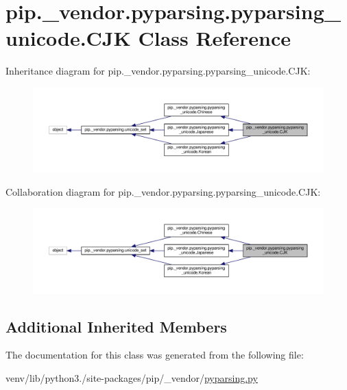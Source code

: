 \hypertarget{classpip_1_1__vendor_1_1pyparsing_1_1pyparsing__unicode_1_1CJK}{}\section{pip.\+\_\+vendor.\+pyparsing.\+pyparsing\+\_\+unicode.\+C\+JK Class Reference}
\label{classpip_1_1__vendor_1_1pyparsing_1_1pyparsing__unicode_1_1CJK}


Inheritance diagram for pip.\+\_\+vendor.\+pyparsing.\+pyparsing\+\_\+unicode.\+C\+JK\+:
\nopagebreak
\begin{figure}[H]
\begin{center}
\leavevmode
\includegraphics[width=350pt]{classpip_1_1__vendor_1_1pyparsing_1_1pyparsing__unicode_1_1CJK__inherit__graph}
\end{center}
\end{figure}


Collaboration diagram for pip.\+\_\+vendor.\+pyparsing.\+pyparsing\+\_\+unicode.\+C\+JK\+:
\nopagebreak
\begin{figure}[H]
\begin{center}
\leavevmode
\includegraphics[width=350pt]{classpip_1_1__vendor_1_1pyparsing_1_1pyparsing__unicode_1_1CJK__coll__graph}
\end{center}
\end{figure}
\subsection*{Additional Inherited Members}


The documentation for this class was generated from the following file\+:\begin{DoxyCompactItemize}
\item 
venv/lib/python3./site-\/packages/pip/\+\_\+vendor/\hyperlink{pip_2__vendor_2pyparsing_8py}{pyparsing.\+py}\end{DoxyCompactItemize}
